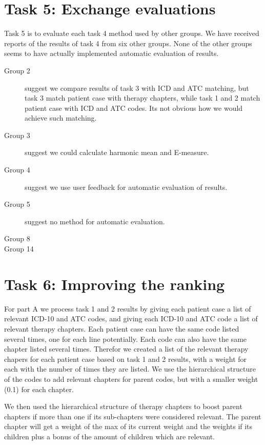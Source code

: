 \section{Task 5: Exchange evaluations}
Task 5 is to evaluate each task 4 method used by other groups.
We have received reports of the results of task 4 from six other groups. 
None of the other groups seems to have actually implemented automatic
evaluation of results.

\begin{description}
	\item[Group 2] suggest we compare results of task 3 with ICD and ATC
		matching, but task 3 match patient case with therapy chapters, while
		task 1 and 2 match patient case with ICD and ATC codes. Its not
		obvious how we would achieve such matching.
	\item[Group 3] suggest we could calculate harmonic mean and E-measure.
	\item[Group 4] suggest we use user feedback for automatic evaluation of
		results.
	\item[Group 5] suggest no method for automatic evaluation.
	\item[Group 8] 
	\item[Group 14]
\end{description}


\section{Task 6: Improving the ranking}
For part A we process task 1 and 2 results by giving each patient case a list
of relevant ICD-10 and ATC codes, and giving each ICD-10 and ATC code a list
of relevant therapy chapters. Each patient case can have the same code listed
several times, one for each line potentially. Each code can also have the same
chapter listed several times. Therefor we created a list of the relevant
therapy chapers for each patient case based on task 1 and 2 results, with a
weight for each with the number of times they are listed. We use the
hierarchical structure of the codes to add relevant chapters for parent codes,
but with a smaller weight (0.1) for each chapter.

We then used the hierarchical structure of therapy chapters to boost parent
chapters if more than one if its sub-chapters were considered relevant. The
parent chapter will get a weight of the max of its current weight and the
weights if its children plus a bonus of the amount of children which are
relevant.

